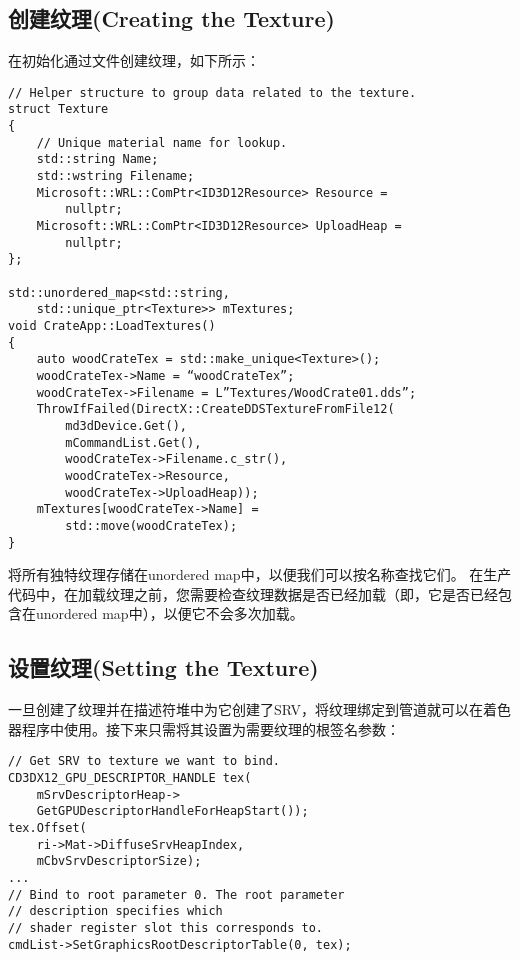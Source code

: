 \subsection{创建纹理(Creating the Texture)}
\begin{flushleft}
在初始化通过文件创建纹理，如下所示：\\
\end{flushleft}

\begin{lstlisting}
// Helper structure to group data related to the texture.
struct Texture
{
    // Unique material name for lookup.
    std::string Name;
    std::wstring Filename;
    Microsoft::WRL::ComPtr<ID3D12Resource> Resource =
        nullptr;
    Microsoft::WRL::ComPtr<ID3D12Resource> UploadHeap =
        nullptr;
};

std::unordered_map<std::string,
    std::unique_ptr<Texture>> mTextures;
void CrateApp::LoadTextures()
{
    auto woodCrateTex = std::make_unique<Texture>();
    woodCrateTex->Name = “woodCrateTex”;
    woodCrateTex->Filename = L”Textures/WoodCrate01.dds”;
    ThrowIfFailed(DirectX::CreateDDSTextureFromFile12(
        md3dDevice.Get(),
        mCommandList.Get(), 
        woodCrateTex->Filename.c_str(),
        woodCrateTex->Resource, 
        woodCrateTex->UploadHeap));
    mTextures[woodCrateTex->Name] =
        std::move(woodCrateTex);
}
\end{lstlisting}

\begin{flushleft}
将所有独特纹理存储在unordered map中，以便我们可以按名称查找它们。 在生产代码中，在加载纹理之前，您需要检查纹理数据是否已经加载（即，它是否已经包含在unordered map中），以便它不会多次加载。\\
\end{flushleft}

\subsection{设置纹理(Setting the Texture)}
\begin{flushleft}
一旦创建了纹理并在描述符堆中为它创建了SRV，将纹理绑定到管道就可以在着色器程序中使用。接下来只需将其设置为需要纹理的根签名参数：\\
\end{flushleft}

\begin{lstlisting}
// Get SRV to texture we want to bind.
CD3DX12_GPU_DESCRIPTOR_HANDLE tex(
    mSrvDescriptorHeap->
    GetGPUDescriptorHandleForHeapStart());
tex.Offset(
    ri->Mat->DiffuseSrvHeapIndex,
    mCbvSrvDescriptorSize);
...
// Bind to root parameter 0. The root parameter
// description specifies which
// shader register slot this corresponds to.
cmdList->SetGraphicsRootDescriptorTable(0, tex);
\end{lstlisting}

